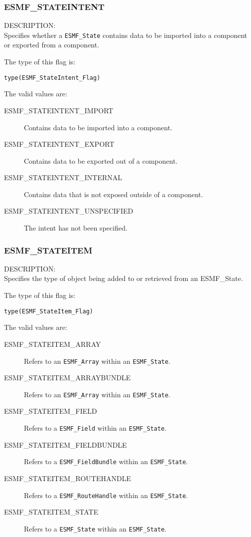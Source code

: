 
\subsubsection{ESMF\_STATEINTENT}
\label{const:stateintent}

{\sf DESCRIPTION:\\}
Specifies whether a {\tt ESMF\_State} contains data to be imported
into a component or exported from a component.

The type of this flag is:

{\tt type(ESMF\_StateIntent\_Flag)}

The valid values are:
\begin{description}
   \item [ESMF\_STATEINTENT\_IMPORT] 
         Contains data to be imported into a component.
   \item [ESMF\_STATEINTENT\_EXPORT]
         Contains data to be exported out of a component.
   \item [ESMF\_STATEINTENT\_INTERNAL]
         Contains data that is not exposed outside of a component.
   \item [ESMF\_STATEINTENT\_UNSPECIFIED]
         The intent has not been specified.
\end{description}

\subsubsection{ESMF\_STATEITEM}
\label{const:stateitem}

{\sf DESCRIPTION:\\}
Specifies the type of object being added to or retrieved from an
{ESMF\_State.}

The type of this flag is:

{\tt type(ESMF\_StateItem\_Flag)}

The valid values are:
\begin{description}
   \item [ESMF\_STATEITEM\_ARRAY]
         Refers to an {\tt ESMF\_Array} within an {\tt ESMF\_State}.
   \item [ESMF\_STATEITEM\_ARRAYBUNDLE]
         Refers to an {\tt ESMF\_Array} within an {\tt ESMF\_State}.
   \item [ESMF\_STATEITEM\_FIELD]
         Refers to a {\tt ESMF\_Field} within an {\tt ESMF\_State}.
   \item [ESMF\_STATEITEM\_FIELDBUNDLE] 
         Refers to a {\tt ESMF\_FieldBundle} within an {\tt ESMF\_State}.
   \item [ESMF\_STATEITEM\_ROUTEHANDLE] 
         Refers to a {\tt ESMF\_RouteHandle} within an {\tt ESMF\_State}.
   \item [ESMF\_STATEITEM\_STATE]
         Refers to a {\tt ESMF\_State} within an {\tt ESMF\_State}.
\end{description}












